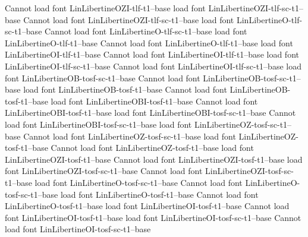 {{{{{{{Cannot load font LinLibertineOZI-tlf-t1--base
load font	LinLibertineOZI-tlf-sc-t1--base
Cannot load font LinLibertineOZI-tlf-sc-t1--base
load font	LinLibertineO-tlf-sc-t1--base
Cannot load font LinLibertineO-tlf-sc-t1--base
load font	LinLibertineO-tlf-t1--base
Cannot load font LinLibertineO-tlf-t1--base
load font	LinLibertineOI-tlf-t1--base
Cannot load font LinLibertineOI-tlf-t1--base
load font	LinLibertineOI-tlf-sc-t1--base
Cannot load font LinLibertineOI-tlf-sc-t1--base
load font	LinLibertineOB-tosf-sc-t1--base
Cannot load font LinLibertineOB-tosf-sc-t1--base
load font	LinLibertineOB-tosf-t1--base
Cannot load font LinLibertineOB-tosf-t1--base
load font	LinLibertineOBI-tosf-t1--base
Cannot load font LinLibertineOBI-tosf-t1--base
load font	LinLibertineOBI-tosf-sc-t1--base
Cannot load font LinLibertineOBI-tosf-sc-t1--base
load font	LinLibertineOZ-tosf-sc-t1--base
Cannot load font LinLibertineOZ-tosf-sc-t1--base
load font	LinLibertineOZ-tosf-t1--base
Cannot load font LinLibertineOZ-tosf-t1--base
load font	LinLibertineOZI-tosf-t1--base
Cannot load font LinLibertineOZI-tosf-t1--base
load font	LinLibertineOZI-tosf-sc-t1--base
Cannot load font LinLibertineOZI-tosf-sc-t1--base
load font	LinLibertineO-tosf-sc-t1--base
Cannot load font LinLibertineO-tosf-sc-t1--base
load font	LinLibertineO-tosf-t1--base
Cannot load font LinLibertineO-tosf-t1--base
load font	LinLibertineOI-tosf-t1--base
Cannot load font LinLibertineOI-tosf-t1--base
load font	LinLibertineOI-tosf-sc-t1--base
Cannot load font LinLibertineOI-tosf-sc-t1--base
}}}}}}}
